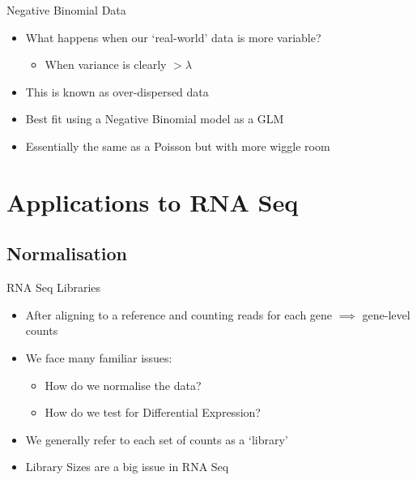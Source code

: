 \documentclass[aspectratio=169,11pt]{beamer}
\begin{document}
\begin{frame}{Negative Binomial Data}

	\begin{itemize}
		\item What happens when our `real-world' data is more variable?
		\begin{itemize}
			\item When variance is clearly $>\lambda$
		\end{itemize}
		\item This is known as over-dispersed data
		\item Best fit using a Negative Binomial model as a GLM
		\item Essentially the same as a Poisson but with more wiggle room
	\end{itemize}

\end{frame}


\section{Applications to RNA Seq}

\subsection{Normalisation}

\begin{frame}{RNA Seq Libraries}
	\begin{itemize}
		\item After aligning to a reference and counting reads for each gene $\implies$ gene-level counts
		\item We face many familiar issues:
		\begin{itemize}
			\item How do we normalise the data?
			\item How do we test for Differential Expression?
		\end{itemize}
		\item We generally refer to each set of counts as a `library'
		\item Library Sizes are a big issue in RNA Seq
	\end{itemize}

\end{frame}
\end{document}
